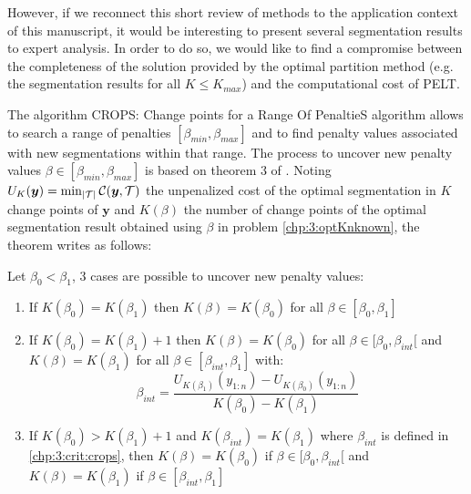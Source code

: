However, if we reconnect this short review of methods to the application context of this manuscript, it would be interesting to present several segmentation results to expert analysis. In order to do so, we would like to find a compromise between the completeness of the solution provided by the optimal partition method (e.g. the segmentation results for all $K \leq K_{max}$) and the computational cost of PELT. 

The algorithm CROPS: Change points for a Range Of PenaltieS algorithm \citep{haynes2017} allows to search a range of penalties $[\beta_{min},\beta_{max}]$ and to find penalty values associated with new segmentations within that range. The process to uncover new penalty values $\beta \in [\beta_{min},\beta_{max}]$ is based on theorem 3 of \cite{haynes2017}. Noting $U_K(\bm y) = \min_{\lvert{\mathcal T}\rvert} {\mathcal C}(\bm y,{\mathcal T})$ the unpenalized cost of the optimal segmentation in $K$ change points of $\bm y$ and $K(\beta)$ the number of change points of the optimal segmentation result obtained using $\beta$ in problem \eqref{chp:3:optKnknown}, the theorem writes as follows:

\begin{theorem}
Let $\beta_0 < \beta_1$, 3 cases are possible to uncover new penalty values:
\begin{enumerate}
  \item If $K(\beta_0) = K(\beta_1)$ then $K(\beta) = K(\beta_0)$ for all $\beta \in [\beta_0,\beta_1]$
  \item If $K(\beta_0) = K(\beta_1)+1$ then $K(\beta) = K(\beta_0)$ for all $\beta\in[\beta_0,\beta_{int}[$ and $K(\beta) = K(\beta_1)$ for all $\beta\in[\beta_{int},\beta_1]$ with:
  \begin{equation}\label{chp:3:crit:crops}
    \beta_{int} = \frac{U_{K(\beta_1)}(y_{1:n})-U_{K(\beta_0)}(y_{1:n})}{K(\beta_0)-K(\beta_1)}
  \end{equation}
  \item If $K(\beta_0) > K(\beta_1)+1$ and $K(\beta_{int}) = K(\beta_1)$ where $\beta_{int}$ is defined in \eqref{chp:3:crit:crops}, then $K(\beta) = K(\beta_0)$ if $\beta\in[\beta_0,\beta_{int}[$ and $K(\beta) = K(\beta_1)$ if $\beta\in [\beta_{int},\beta_1]$
\end{enumerate}
\end{theorem} 

